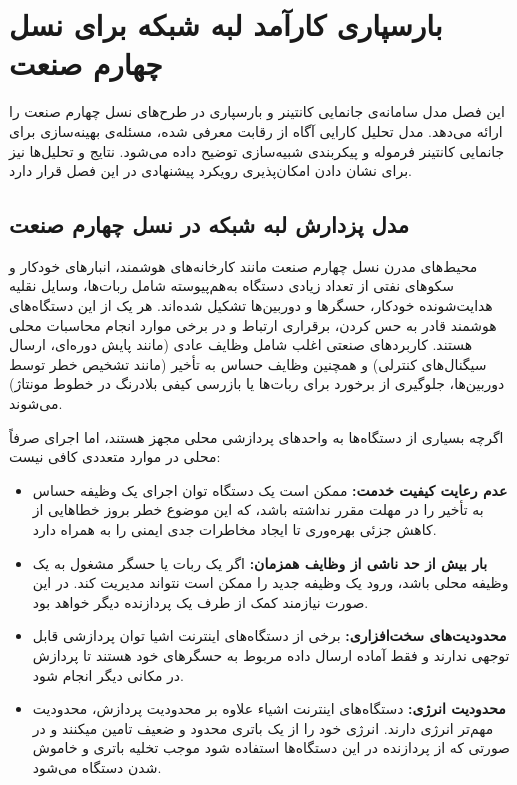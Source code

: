 
\chapter{بارسپاری کارآمد لبه شبکه برای نسل چهارم صنعت}\label{chap:model}

این فصل مدل سامانه‌ی جانمایی کانتینر و بارسپاری در طرح‌های  نسل چهارم صنعت را ارائه می‌دهد. مدل تحلیل کارایی آگاه از رقابت معرفی شده، مسئله‌ی بهینه‌سازی برای جانمایی کانتینر فرموله و پیکربندی شبیه‌سازی توضیح داده می‌شود. نتایج و تحلیل‌ها نیز برای نشان دادن امکان‌پذیری رویکرد پیشنهادی در این فصل قرار دارد.

\section{مدل پزدارش لبه شبکه در نسل چهارم صنعت}

محیط‌های مدرن نسل چهارم صنعت مانند کارخانه‌های هوشمند، انبارهای خودکار و سکوهای نفتی از تعداد زیادی دستگاه به‌هم‌پیوسته شامل ربات‌ها، وسایل نقلیه هدایت‌شونده خودکار، حسگرها و دوربین‌ها تشکیل شده‌اند. هر یک از این دستگاه‌های هوشمند قادر به حس کردن، برقراری ارتباط و در برخی موارد انجام محاسبات محلی هستند. کاربردهای صنعتی اغلب شامل وظایف عادی (مانند پایش دوره‌ای، ارسال سیگنال‌های کنترلی) و همچنین وظایف حساس به تأخیر (مانند تشخیص خطر توسط دوربین‌ها، جلوگیری از برخورد برای ربات‌ها یا بازرسی کیفی بلادرنگ در خطوط مونتاژ) می‌شوند.

اگرچه بسیاری از دستگاه‌ها به واحدهای پردازشی محلی مجهز هستند، اما اجرای صرفاً محلی در موارد متعددی کافی نیست:

\begin{itemize}
\item
\textbf{عدم رعایت کیفیت خدمت:} ممکن است یک دستگاه توان اجرای یک وظیفه حساس به تأخیر را در مهلت مقرر نداشته باشد، که این موضوع خطر بروز خطاهایی از کاهش جزئی بهره‌وری تا ایجاد مخاطرات جدی ایمنی را به همراه دارد.
\item
\textbf{بار بیش از حد ناشی از وظایف همزمان:} اگر یک ربات یا حسگر مشغول به یک وظیفه محلی باشد، ورود یک وظیفه جدید را ممکن است نتواند مدیریت کند. در این صورت نیازمند کمک از طرف یک پردازنده دیگر خواهد بود.
\item
\textbf{محدودیت‌های سخت‌افزاری:} برخی از دستگاه‌های اینترنت اشیا توان پردازشی قابل توجهی ندارند و فقط آماده ارسال داده مربوط به حسگرهای خود هستند تا پردازش در مکانی دیگر انجام شود.
\item
\textbf{محدودیت انرژی:} دستگاه‌های اینترنت اشیاء علاوه بر محدودیت پردازش، محدودیت مهم‌تر انرژی دارند. انرژی خود را از یک باتری محدود و ضعیف تامین میکنند و در صورتی که از پردازنده در این دستگاه‌ها استفاده شود موجب تخلیه باتری و خاموش شدن دستگاه می‌شود.
\end{itemize}

